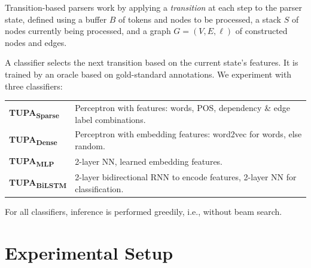 \documentclass[a0,portrait]{a0poster}
\newcommand{\parser}[1]{TUPA\textsubscript{#1}}
\begin{document}
\begin{multicols}{2}
Transition-based parsers work by applying a \textit{transition}
at each step to the parser state,
defined using a buffer $B$ of tokens and nodes to be processed,
a stack $S$ of nodes currently being processed,
and a graph $G=(V,E,\ell)$ of constructed nodes and edges.

\vspace{5mm}
A classifier selects the next transition based on the current state's features.
It is trained by an oracle based on gold-standard annotations.
We experiment with three classifiers:
\begin{flushleft}
	\begin{tabular}{ll}
	\textbf{\parser{Sparse}} & Perceptron with features: words, POS, dependency \& edge label combinations. \\
	\textbf{\parser{Dense}} & Perceptron with embedding features: word2vec \cite{mikolov2013efficient} for words, else random. \\
	\textbf{\parser{MLP}} & 2-layer NN, learned embedding features. \\
	\textbf{\parser{BiLSTM}} & 2-layer bidirectional RNN to encode features, 2-layer NN for classification. \\
	\end{tabular}
\end{flushleft}
\vspace{5mm}
For all classifiers, inference is performed greedily, i.e., without beam search.




\section*{Experimental Setup}


\end{multicols}
\end{document}
